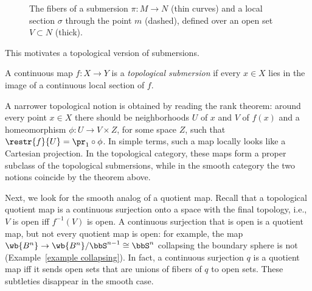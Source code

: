 \begin{figure}[tp]
    \centering
    \caption{The fibers of a submersion $\pi:M\to N$ (thin curves) and a local section $\sigma$ through the point $m$ (dashed), defined over an open set $V\subset N$ (thick).}
    \label{fig local section}
\end{figure}

This motivates a topological version of submersions.

\begin{defn}
    A continuous map $f:X\to Y$ is a \emph{topological submersion} if every $x\in X$ lies in the image of a continuous local section of $f$.
\end{defn}
A narrower topological notion is obtained by reading the rank theorem: around every point $x\in X$ there should be neighborhoods $U$ of $x$ and $V$ of $f(x)$ and a homeomorphism $\phi:U\to V\times Z$, for some space $Z$, such that $\restr{f}{U}=\pr_1\circ\phi$. In simple terms, such a map locally looks like a Cartesian projection. In the topological category, these maps form a proper subclass of the topological submersions, while in the smooth category the two notions coincide by the theorem above.

Next, we look for the smooth analog of a quotient map. Recall that a topological quotient map is a continuous surjection onto a space with the final topology, i.e., $V$ is open iff $f^{-1}(V)$ is open. A continuous surjection that is open is a quotient map, but not every quotient map is open: for example, the map $\wb{B^n}\to\wb{B^n}/\bbS^{n-1}\cong\bbS^n$ collapsing the boundary sphere is not (Example~\ref{example collapsing}). In fact, a continuous surjection $q$ is a quotient map iff it sends open sets that are unions of fibers of $q$ to open sets. These subtleties disappear in the smooth case.


